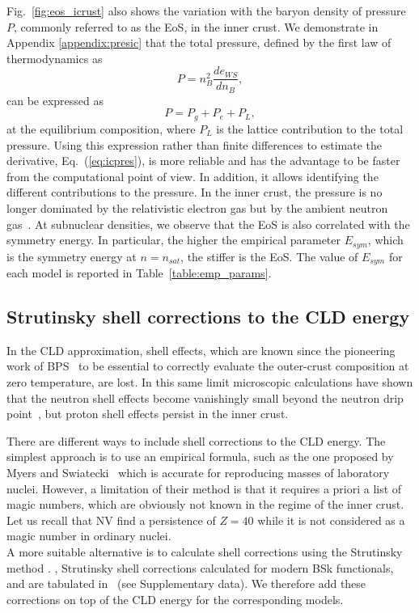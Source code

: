 Fig.~\ref{fig:eos_icrust} also shows the variation with the 
baryon density of pressure $P$, commonly referred to as the EoS, in the inner
crust. We demonstrate in Appendix \ref{appendix:presic} that the total
pressure, defined by the first law of thermodynamics as
%
\begin{equation}
  P = {n_B^2}\frac{de_{WS}}{dn_B},\label{eq:icpres}
\end{equation}
%
can be expressed as
%
\begin{equation}
  P = P_g + P_e + P_L,
\end{equation}
%
at the equilibrium composition,
where $P_L$ is the lattice contribution to the total pressure. Using this
expression rather than finite differences to estimate the derivative,
Eq.~(\ref{eq:icpres}), is more reliable and has the advantage to be faster from the
computational point of view. In addition, it allows identifying the different
contributions to the pressure. In the inner crust, the pressure is no longer 
dominated by the relativistic electron gas but by the ambient neutron 
gas~\cite{Carreau2017}. At subnuclear densities, we observe that the EoS is 
also correlated with the symmetry energy. In particular, the higher the 
empirical parameter $E_{sym}$, which is the symmetry energy at $n=n_{sat}$, the 
stiffer is the EoS. The value of $E_{sym}$ for each model is reported in
Table~\ref{table:emp_params}.

\subsection{Strutinsky shell corrections to the CLD
energy}\label{subsec:strutinsky}

In the CLD approximation, shell effects, which are known since the pioneering 
work of BPS~\cite{BPS} to be essential to correctly evaluate the outer-crust
composition at zero temperature, are lost.
In this same limit microscopic calculations have shown that the neutron 
shell effects become vanishingly small beyond the neutron drip 
point~\cite{Chamel2006,Chamel2007}, but proton shell effects 
persist in the inner crust.

There are different ways to include shell corrections to the CLD energy. The
simplest approach is to use an empirical formula, such as the one proposed
by Myers and Swiatecki~\cite{Myers1966} which is accurate for reproducing
masses of laboratory nuclei. 
However, a limitation of their method 
is that it requires a priori a list of magic numbers, which are obviously not
known in the regime of the inner crust. Let us recall that NV find a
persistence of $Z=40$ while it is not considered as a magic number in ordinary
nuclei.\\
A more suitable alternative is to calculate shell corrections using the
Strutinsky method \cite{Onsi2008}. 
, Strutinsky shell corrections  calculated 
for modern BSk functionals, and are tabulated in~\cite{Pearson2018} (see
Supplementary data). We therefore add these corrections on top of the CLD 
energy for the corresponding models.

